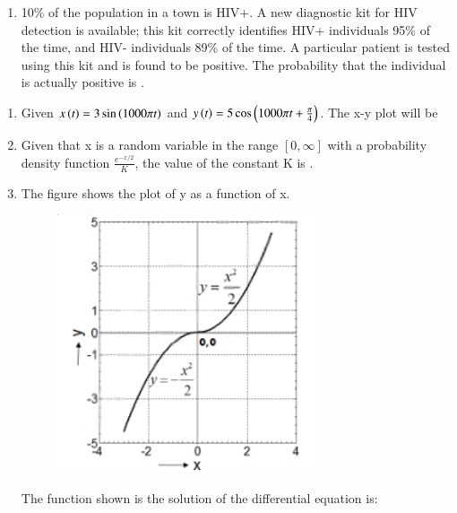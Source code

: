 \documentclass[journal,12pt,onecolumn]{IEEEtran}
\theoremstyle{remark}
\begin{document}
\begin{enumerate}
    \item 10\% of the population in a town is HIV+. A new diagnostic kit for HIV detection is available; this kit correctly identifies HIV+ individuals 95\% of the time, and HIV- individuals 89\% of the time. A particular patient is tested using this kit and is found to be positive. The probability that the individual is actually positive is \underline{\hspace{2cm}}.

    \hfill{}

\end{enumerate}

\clearpage

\begin{enumerate}
    \item Given $x\left(t\right) = 3 \sin\left(1000 \pi t\right)$ and $y\left(t\right) = 5 \cos\left(1000 \pi t + \frac{\pi}{4}\right)$. The x-y plot will be

    \hfill{}
        \begin{enumerate}
        \end{enumerate}
    
    \item Given that x is a random variable in the range $[0, \infty]$ with a probability density function $\frac{e^{-x/2}}{K}$, the value of the constant K is \underline{\hspace{2cm}}.

    \hfill{}

    
    
    \item The figure shows the plot of y as a function of x.
    \begin{figure}[H]
        \centering
        \includegraphics[width=0.5\columnwidth]{q3}
        \caption*{}
        \label{fig:q3}
    \end{figure}
    The function shown is the solution of the differential equation  is:


\end{enumerate}
\end{document}
